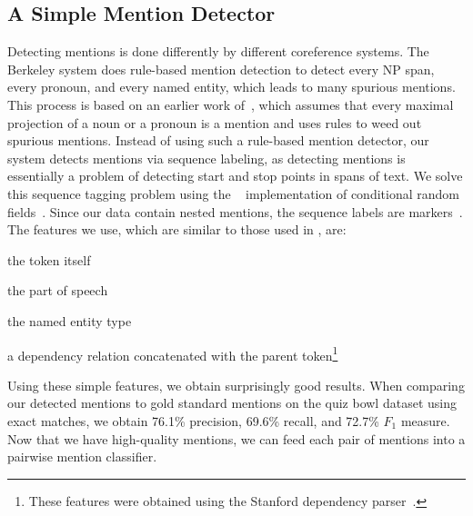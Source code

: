 \subsection{A Simple Mention Detector}
Detecting mentions is done differently by different coreference systems. The
Berkeley system does rule-based mention detection to detect every NP span, every
pronoun, and every named entity, which leads to many spurious mentions. This
process is based on an earlier work of~, which
assumes that every maximal projection of a noun or a pronoun is a mention and
uses rules to weed out spurious mentions. Instead of using such a rule-based
mention detector, our system detects mentions via sequence labeling, as
detecting mentions is essentially a problem of detecting start and stop points
in spans of text. We solve this sequence tagging problem using the
~\cite{McCallumMALLET} implementation of conditional random
fields~\cite{lafferty2001conditional}. Since our data contain nested mentions,
the sequence labels are  markers~\cite{ratinov2009design}. The features
we use, which are similar to those used in , are:
\begin{itemize*}
\item the token itself
\item the part of speech
\item the named entity type
\item a dependency relation concatenated with the parent token\footnote{These features were obtained using the Stanford dependency parser~\cite{de2006generating}.}
\end{itemize*}

Using these simple features, we obtain surprisingly good results. When comparing
our detected mentions to gold standard mentions on the quiz bowl dataset using
exact matches, we obtain 76.1\% precision, 69.6\% recall, and 72.7\% $F_1$
measure. Now that we have high-quality mentions, we can feed each pair of
mentions into a pairwise mention classifier.

